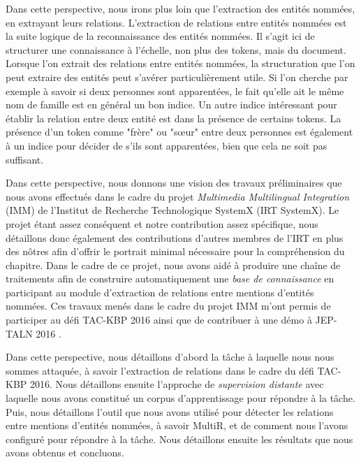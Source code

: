 \documentclass[PhD-Yoann-Dupont.tex]{subfiles}
\begin{document}
Dans cette perspective, nous irons plus loin que l'extraction des entités nommées, en extrayant leurs relations. L'extraction de relations entre entités nommées est la suite logique de la reconnaissance des entités nommées. Il s'agit ici de structurer une connaissance à l'échelle, non plus des tokens, mais du document. Lorsque l'on extrait des relations entre entités nommées, la structuration que l'on peut extraire des entités peut s'avérer particulièrement utile. Si l'on cherche par exemple à savoir si deux personnes sont apparentées, le fait qu'elle ait le même nom de famille est en général un bon indice. Un autre indice intéressant pour établir la relation entre deux entité est dans la présence de certains tokens. La présence d'un token comme "frère" ou "s\oe ur" entre deux personnes est également à un indice pour décider de s'ils sont apparentées, bien que cela ne soit pas suffisant.

Dans cette perspective, nous donnons une vision des travaux préliminaires que nous avons effectués dans le cadre du projet \textit{Multimedia Multilingual Integration} (IMM) de l'Institut de Recherche Technologique SystemX (IRT SystemX). Le projet étant assez conséquent et notre contribution assez spécifique, nous détaillons donc également des contributions d'autres membres de l'IRT en plus des nôtres afin d'offrir le portrait minimal nécessaire pour la compréhension du chapitre. Dans le cadre de ce projet, nous avons aidé à produire une chaîne de traitements afin de construire automatiquement une \emph{base de connaissance} en participant au module d'extraction de relations entre mentions d'entités nommées. Ces travaux menés dans le cadre du projet IMM m'ont permis de participer au défi TAC-KBP 2016 \citep{rahman2017tac} ainsi que de contribuer à une démo à JEP-TALN 2016 \citep{mesnard2016}.

Dans cette perspective, nous détaillons d'abord la tâche à laquelle nous nous sommes attaquée, à savoir l'extraction de relations dans le cadre du défi TAC-KBP 2016. Nous détaillons ensuite l'approche de \emph{supervision distante} avec laquelle nous avons constitué un corpus d'apprentissage pour répondre à la tâche. Puis, nous détaillons l'outil que nous avons utilisé pour détecter les relations entre mentions d'entités nommées, à savoir MultiR, et de comment nous l'avons configuré pour répondre à la tâche. Nous détaillons ensuite les résultats que nous avons obtenus et concluons.
\end{document}

